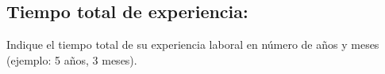 \subsection{Tiempo total de experiencia:}
\begin{instrucciones}
  Indique el tiempo total de su experiencia laboral en número de años
  y meses (ejemplo: 5 años, 3 meses).
\end{instrucciones}


